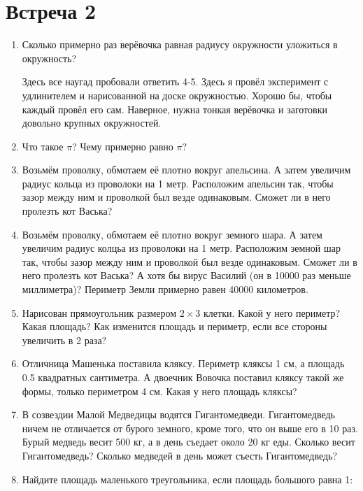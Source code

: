 \documentclass[a4paper, 12pt]{article}
\begin{document}
\newpage
\section{Встреча 2}

\begin{enumerate}

  \item Сколько примерно раз верёвочка равная радиусу окружности уложиться в окружность?

   Здесь все наугад пробовали ответить 4-5.
   Здесь я провёл эксперимент с удлинителем и нарисованной на доске окружностью. 
   Хорошо бы, чтобы каждый провёл его сам. 
   Наверное, нужна тонкая верёвочка и заготовки довольно крупных окружностей.

  \item Что такое $\pi$? Чему примерно равно $\pi$?

  \item Возьмём проволку, обмотаем её плотно вокруг апельсина. А затем увеличим радиус кольца из проволоки на 1 метр. Расположим апельсин так, чтобы зазор между ним и проволкой был везде одинаковым. Сможет ли в него пролезть кот Васька?

  \item Возьмём проволку, обмотаем её плотно вокруг земного шара. А затем увеличим радиус колцьа из проволоки на 1 метр. Расположим земной шар так, чтобы зазор между ним и проволкой был везде одинаковым. Сможет ли в него пролезть кот Васька? А хотя бы вирус Василий (он в 10000 раз меньше миллиметра)? Периметр Земли примерно равен 40000 километров.

    \item Нарисован прямоугольник размером $2\times 3$ клетки. Какой у него периметр? Какая площадь? Как изменится площадь и периметр, если все стороны увеличить в 2 раза?


  \item Отличница Машенька поставила кляксу. Периметр кляксы 1 см, а площадь 0.5 квадратных сантиметра. А двоечник Вовочка поставил кляксу такой же формы, только периметром 4 см. Какая у него площадь кляксы?

  \item В созвездии Малой Медведицы водятся Гигантомедведи. Гигантомедведь ничем не отличается от бурого земного, кроме того, что он выше его в 10 раз. Бурый медведь весит 500 кг, а в день съедает около 20 кг еды. Сколько весит Гигантомедведь? Сколько медведей в день может съесть Гигантомедведь?

  \item Найдите площадь маленького треугольника, если площадь большого равна 1:
    
    \vspace{5cm}



\end{enumerate}
\end{document}
